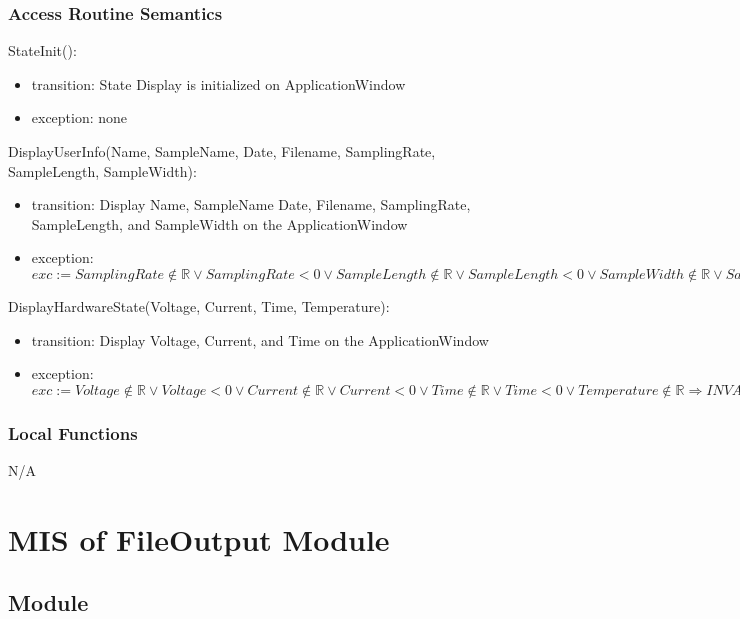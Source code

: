 \documentclass[12pt, titlepage]{article}
\begin{document}
\subsubsection{Access Routine Semantics}

\noindent StateInit():
\begin{itemize}
\item transition: State Display is initialized on ApplicationWindow
\item exception: none
\end{itemize}

\noindent DisplayUserInfo(Name, SampleName, Date, Filename, SamplingRate, SampleLength, SampleWidth):
\begin{itemize}
\item transition: Display Name, SampleName Date, Filename, SamplingRate, SampleLength, and SampleWidth on the ApplicationWindow
\item exception: $exc:= SamplingRate \notin \mathbb{R} \lor SamplingRate < 0 \lor SampleLength \notin \mathbb{R} \lor SampleLength < 0 \lor SampleWidth \notin \mathbb{R} \lor SampleWidth < 0 \Rightarrow INVALID$
\end{itemize}

\noindent DisplayHardwareState(Voltage, Current, Time, Temperature):
\begin{itemize}
\item transition: Display Voltage, Current, and Time on the ApplicationWindow
\item exception: $exc:= Voltage \notin  \mathbb{R} \lor Voltage < 0 \lor  Current \notin  \mathbb{R} \lor Current < 0 \lor  Time \notin  \mathbb{R} \lor Time < 0 \lor  Temperature \notin  \mathbb{R} \Rightarrow INVALID$
\end{itemize}

\subsubsection{Local Functions}
N/A

\newpage

\section{MIS of FileOutput Module} \label{FO} 

\subsection{Module}
\end{document}
